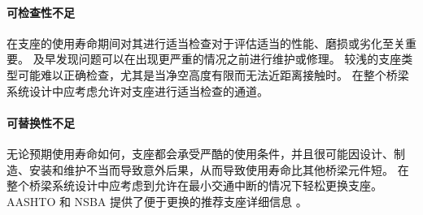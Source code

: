 \paragraph{可检查性不足}
在支座的{使用寿命}期间对其进行适当检查对于评估适当的性能、磨损或劣化至关重要。 及早发现问题可以在出现更严重的情况之前进行维护或修理。 较浅的支座类型可能难以正确检查，尤其是当净空高度有限而无法近距离接触时。 在整个桥梁系统设计中应考虑允许对支座进行适当检查的通道。

\paragraph{可替换性不足}

无论预期{使用寿命}如何，支座都会承受严酷的使用条件，并且很可能因设计、制造、安装和维护不当而导致意外后果，从而导致{使用寿命}比其他桥梁{元件}短。 在整个桥梁系统设计中应考虑到允许在最小交通中断的情况下轻松更换支座。 AASHTO 和 NSBA 提供了便于更换的推荐支座详细信息 \cite{aashtonsba2004s}。

